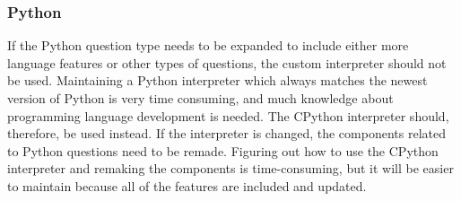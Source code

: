 \subsubsection{Python}
If the Python question type needs to be expanded to include either more language features or other types of questions, the custom interpreter should not be used. Maintaining a Python interpreter which always matches the newest version of Python is very time consuming, and much knowledge about programming language development is needed. The CPython interpreter should, therefore, be used instead. If the interpreter is changed, the components related to Python questions need to be remade. Figuring out how to use the CPython interpreter and remaking the components is time-consuming, but it will be easier to maintain because all of the features are included and updated.